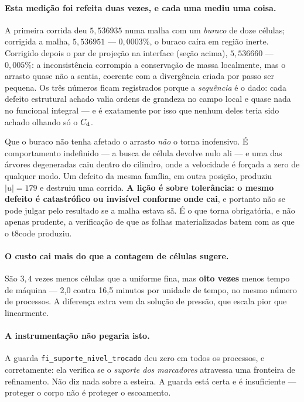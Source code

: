 \paragraph{Esta medição foi refeita duas vezes, e cada uma mediu uma coisa.}
A primeira corrida deu $5{,}536935$ numa malha com um \emph{buraco} de doze
células; corrigida a malha, $5{,}536951$ --- $0{,}0003\%$, o buraco caíra em
região inerte. Corrigido depois o par de projeção na interface (seção acima),
$5{,}536660$ --- $0{,}005\%$: a inconsistência corrompia a conservação de massa
localmente, mas o arrasto quase não a sentia, coerente com a divergência criada
por passo ser pequena. Os três números ficam registrados porque a
\emph{sequência} é o dado: cada defeito estrutural achado valia ordens de
grandeza no campo local e quase nada no funcional integral --- e é exatamente
por isso que nenhum deles teria sido achado olhando só o $C_{\mathrm{d}}$.

Que o buraco não tenha afetado o arrasto \emph{não} o torna inofensivo. É
comportamento indefinido --- a busca de célula devolve nulo ali --- e uma das
árvores degeneradas caiu dentro do cilindro, onde a velocidade é forçada a zero
de qualquer modo. Um defeito da mesma família, em outra posição, produziu
$|u| = 179$ e destruiu uma corrida. \textbf{A lição é sobre tolerância: o mesmo
defeito é catastrófico ou invisível conforme onde cai}, e portanto não se pode
julgar pelo resultado se a malha estava sã. É o que torna obrigatória, e não
apenas prudente, a verificação de que as folhas materializadas batem com as que
o t8code produziu.

\paragraph{O custo cai mais do que a contagem de células sugere.} São $3{,}4$
vezes menos células que a uniforme fina, mas \textbf{oito vezes} menos tempo de
máquina --- 2{,}0 contra 16{,}5 minutos por unidade de tempo, no mesmo número de
processos. A diferença extra vem da solução de pressão, que escala pior que
linearmente.

\paragraph{A instrumentação não pegaria isto.} A guarda
\texttt{fi\_suporte\_nivel\_trocado} deu zero em todos os processos, e
corretamente: ela verifica se o \emph{suporte dos marcadores} atravessa uma
fronteira de refinamento. Não diz nada sobre a esteira. A guarda está certa e é
insuficiente --- proteger o corpo não é proteger o escoamento.

